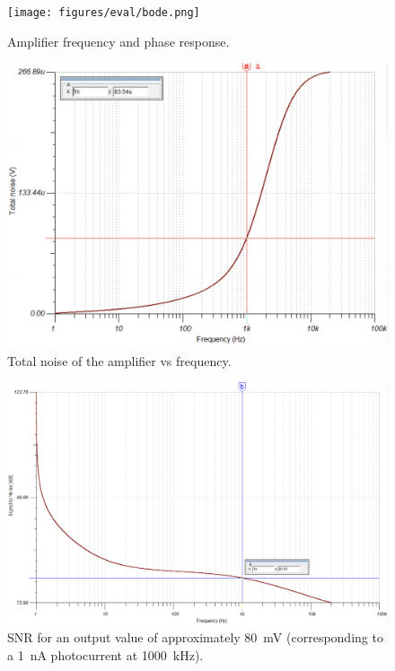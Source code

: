 \begin{figure}[t]
\centering
\texttt{[image: figures/eval/bode.png]}
\caption{Amplifier frequency and phase response.}
\label{fig:bodeplot}
\end{figure}

\begin{figure}[t]
\centering
\includegraphics[width=\widthnarrow]{figures/eval/totalnoise.png}
\caption{Total noise of the amplifier vs frequency.}
\label{fig:totalnoise}
\end{figure}

\begin{figure}[t]
\centering
\includegraphics[width=\widthnarrow]{figures/eval/snr.png}
\caption{SNR for an output value of approximately 80~mV (corresponding to a 1~nA photocurrent at 1000~kHz).}
\label{fig:snr}
\end{figure}

